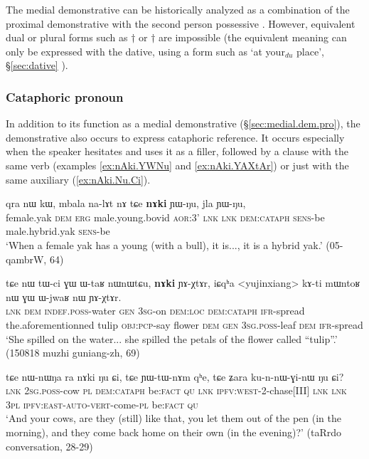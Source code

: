 The medial demonstrative  can be historically analyzed as a combination of the proximal demonstrative  with the second person possessive . However, equivalent dual or plural forms such as  $\dagger$ or $\dagger$ are impossible (the equivalent meaning can only be expressed with the dative, using a form such as  `at your$_{du}$ place', §\ref{sec:dative} ).


\subsubsection{Cataphoric pronoun}
\label{sec:cataph.pron}
In addition to its function as a medial demonstrative (§\ref{sec:medial.dem.pro}), the demonstrative  also occurs to express cataphoric reference. It occurs especially when the speaker hesitates and uses it as a filler, followed by a clause with the same verb (examples \ref{ex:nAki.YWNu} and \ref{ex:nAki.YAXtAr}) or just with the same auxiliary (\ref{ex:nAki.Nu.Ci}).

\begin{exe}
\ex \label{ex:nAki.YWNu}
 \gll qra nɯ kɯ, mbala na-lɤt nɤ tɕe \textbf{nɤki} ɲɯ-ŋu, jla ɲɯ-ŋu, \\
female.yak \textsc{dem} \textsc{erg} male.young.bovid \textsc{aor}:3' \textsc{lnk} \textsc{lnk} \textsc{dem}:\textsc{cataph} \textsc{sens}-be male.hybrid.yak \textsc{sens}-be \\
\glt `When a female yak has a young (with a bull), it is..., it is a hybrid yak.' (05-qambrW, 64)
\end{exe}

\begin{exe}
\ex \label{ex:nAki.YAXtAr}
 \gll tɕe nɯ tɯ-ci ɣɯ ɯ-taʁ nɯnɯtɕu, \textbf{nɤki} ɲɤ-χtɤr, iɕqʰa <yujinxiang> kɤ-ti mɯntoʁ nɯ ɣɯ  ɯ-jwaʁ nɯ ɲɤ-χtɤr.  \\
\textsc{lnk} \textsc{dem} \textsc{indef}.\textsc{poss}-water \textsc{gen} \textsc{3sg}-on \textsc{dem}:\textsc{loc} \textsc{dem}:\textsc{cataph} \textsc{ifr}-spread the.aforementionned tulip \textsc{obj}:\textsc{pcp}-say flower \textsc{dem} \textsc{gen} \textsc{3sg}.\textsc{poss}-leaf \textsc{dem} \textsc{ifr}-spread \\
\glt `She spilled on the water...  she spilled the petals of the flower called ``tulip''.' (150818 muzhi guniang-zh, 69)
\end{exe}

\begin{exe}
\ex \label{ex:nAki.Nu.Ci}
 \gll tɕe nɯ-nɯŋa ra nɤki ŋu ɕi, tɕe ɲɯ-tɯ-nɤm qʰe, tɕe ʑara ku-n-nɯ-ɣi-nɯ ŋu ɕi? \\
\textsc{lnk} \textsc{2sg}.\textsc{poss}-cow \textsc{pl} \textsc{dem}:\textsc{cataph} be:\textsc{fact} \textsc{qu} \textsc{lnk} \textsc{ipfv}:\textsc{west}-2-chase[III] \textsc{lnk} \textsc{lnk} \textsc{3pl} \textsc{ipfv}:\textsc{east}-\textsc{auto}-\textsc{vert}-come-\textsc{pl} be:\textsc{fact} \textsc{qu} \\
\glt `And your cows, are they (still) like that, you let them out of the pen (in the morning), and  they come back home on their own (in the evening)?' (taRrdo conversation, 28-29)
\end{exe}

